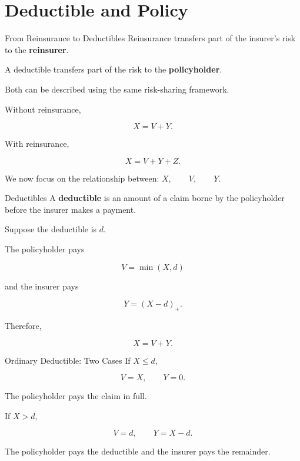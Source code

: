 \documentclass[
  ignorenonframetext,
  aspectratio=169,
]{beamer}
\begin{document}
\begin{frame}
\end{frame}

\section{Deductible and Policy}\label{deductible-and-policy}

\begin{frame}{From Reinsurance to Deductibles}
\protect{}\label{from-reinsurance-to-deductibles}
Reinsurance transfers part of the insurer's risk to the
\textbf{reinsurer}.

A deductible transfers part of the risk to the \textbf{policyholder}.

Both can be described using the same risk-sharing framework.

Without reinsurance,

\[
X=V+Y.
\]

With reinsurance,

\[
\boxed{X=V+Y+Z}.
\]

We now focus on the relationship between: \(X,\qquad V,\qquad Y.\)
\end{frame}

\begin{frame}{Deductibles}
\protect{}\label{deductibles}
A \textbf{deductible} is an amount of a claim borne by the policyholder
before the insurer makes a payment.

Suppose the deductible is \(d\).

The policyholder pays

\[
\boxed{V=\min(X,d)}
\]

and the insurer pays

\[
\boxed{Y=(X-d)_+}.
\]

Therefore,

\[
\boxed{X=V+Y}.
\]
\end{frame}

\begin{frame}{Ordinary Deductible: Two Cases}
\protect{}\label{ordinary-deductible-two-cases}
If \(X\leq d\),

\[
V=X,
\qquad
Y=0.
\]

The policyholder pays the claim in full.

If \(X>d\),

\[
V=d,
\qquad
Y=X-d.
\]

The policyholder pays the deductible and the insurer pays the remainder.
\end{frame}
\end{document}
